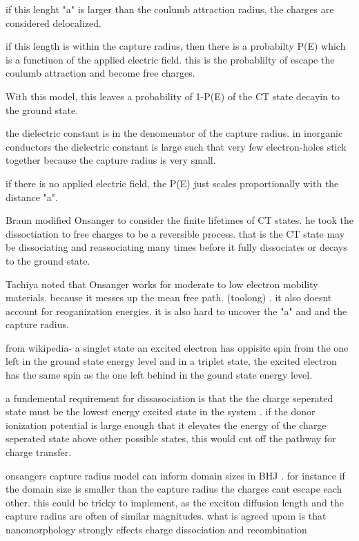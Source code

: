     if this lenght "a" is larger than the coulumb attraction radius, the charges are considered delocalized.

    if this length is within the capture radius, then there is a probabilty P(E) which is a functiuon of the
        applied electric field. this is the probablilty of escape the coulumb attraction and become free charges.

    With this model, this leaves a probability of 1-P(E) of the CT state decayin to the ground state. 

    the dielectric constant is in the denomenator of the capture radius. in inorganic conductors the dielectric 
    constant is large such that very few electron-holes stick together because the capture radius is very small. 

    if there is no applied electric field, the P(E) just scales proportionally with the distance "a". 

    Braun modified Onsanger to consider the finite lifetimes of CT states. he took the dissoctiation 
    to free charges to be a reversible process. that is the CT state may be dissociating and reassociating
    many times before it fully dissociates or decays to the ground state. 

    Tachiya noted that Onsanger works for moderate to low electron mobility materials. because it messes up the 
    mean free path. (toolong) . it also doesnt account for reoganization energies. it is also hard to uncover the
    "a" and and the capture radius. 

    from wikipedia- a singlet state an excited electron has oppisite spin from the one left in the ground
    state energy level  and in a triplet state, the excited electron has the same spin as the one left behind
    in the gound state energy level. 

    a fundemental requirement for dissasociation is that the the charge seperated state must be the
    lowest energy excited state in the system . if the donor ionization potential is large enough that 
    it elevates the energy of the charge seperated state above other possible states, this would cut off
    the pathway for charge transfer.

    onsangers capture radius model can inform domain sizes in BHJ . for instance if the domain size
    is smaller than the capture radius the charges cant escape each other. this could be tricky to implement,
    as the exciton diffusion length and the capture radius are often of similar magnitudes. what is agreed upom 
    is that nanomorphology strongly effects charge dissociation and recombination

